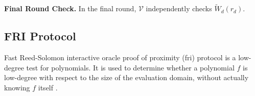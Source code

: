 \noindent\textbf{Final Round Check.}
In the final round, $\mathcal{V}$ independently checks $ \widetilde{W}_{d}(r_{d})$.















\subsection{FRI Protocol}\label{sec:prel_FRI}
Fast Reed-Solomon interactive oracle proof of proximity (\gls{fri}) protocol is a low-degree test for polynomials. It is used to determine whether a polynomial $f$ is low-degree with respect to the size of the evaluation domain,  without actually knowing $f$ itself \cite{FRI2018}. 

